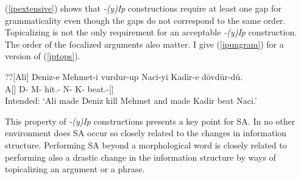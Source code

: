 (\ref{ipextensive}) shows that \textit{-(y)Ip} constructions require at least one gap for grammaticality even though the gaps do not correspond to the same order. Topicalizing is not the only requirement for an acceptable \textit{-(y)Ip} construction. The order of the focalized arguments also matter. I give (\ref{ipungram}) for a version of (\ref{iptops}). 

\begin{exe}
\ex \label{ipungram}
\gll ??[Ali] Deniz-e Mehmet-i vurdur-up Naci-yi Kadir-e dövdür-dü. \\ 
A[{\Nom}] D-{\Dat} M-{\Acc} hit.{\Caus}-{\Pc} N-{\Acc} K-{\Dat} beat.{\Caus}-{\Pst}[{\Tsg}] \\
\glt Intended: `Ali made Deniz kill Mehmet and made Kadir beat Naci.'
\end{exe}

This property of \textit{-(y)Ip} constructions presents a key point for SA. In no other environment does SA occur so closely related to the changes in information structure. Performing SA beyond a morphological word is closely related to performing also a drastic change in the information structure by ways of topicalizing an argument or a phrase.

